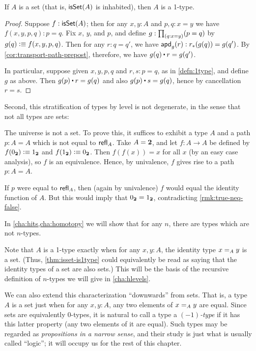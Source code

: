 \begin{lem}\label{thm:isset-is1type}
  If $A$ is a set (that is, $\isset(A)$ is inhabited), then $A$ is a 1-type.
\end{lem}
\begin{proof}
  Suppose $f:\isset(A)$; then for any $x,y:A$ and $p,q:x=y$ we have $f(x,y,p,q):p=q$.
  Fix $x$, $y$, and $p$, and define $g: \prd{q:x=y} (p=q)$ by $g(q) \defeq f (x,y,p,q)$.
  Then for any $r:q=q'$, we have $\apdfunc{g}(r) : \trans{r}{g(q)} = g(q')$.
  By \autoref{cor:transport-path-prepost}, therefore, we have $g(q) \ct r = g(q')$.

  In particular, suppose given $x,y,p,q$ and $r,s:p=q$, as in \autoref{defn:1type}, and define $g$ as above.
  Then $g(p) \ct r = g(q)$ and also $g(p) \ct s = g(q)$, hence by cancellation $r=s$.
\end{proof}

Second, this stratification of types by level is not degenerate, in the
sense that not all types are sets:

\begin{eg}\label{thm:type-is-not-a-set}
  The universe \type is not a set.
  To prove this, it suffices to exhibit a type $A$ and a path $p:A=A$ which is not equal to $\refl A$.
  Take $A=\bool$, and let $f:A\to A$ be defined by $f(\bfalse)\defeq \btrue$ and $f(\btrue)\defeq \bfalse$.
  Then $f(f(x))=x$ for all $x$ (by an easy case analysis), so $f$ is an equivalence.
  Hence, by univalence, $f$ gives rise to a path $p:A=A$.

  If $p$ were equal to $\refl A$, then (again by univalence) $f$ would equal the identity function of $A$.
  But this would imply that $\bfalse=\btrue$, contradicting \autoref{rmk:true-neq-false}.
\end{eg}

In \autoref{cha:hits,cha:homotopy} we will show that for any $n$, there are types which are not $n$-types.

Note that $A$ is a 1-type exactly when for any $x,y:A$, the identity type $\id[A]xy$ is a set.
(Thus, \autoref{thm:isset-is1type} could equivalently be read as saying that the identity types of a set are also sets.)
This will be the basis of the recursive definition of $n$-types we will give in \autoref{cha:hlevels}.

We can also extend this characterization ``downwards'' from sets.
That is, a type $A$ is a set just when for any $x,y:A$, any two elements of $\id[A]xy$ are equal.
Since sets are equivalently 0-types, it is natural to call a type a \emph{$(-1)$-type} if it has this latter property (any two elements of it are equal).
Such types may be regarded as \emph{propositions in a narrow sense}, and their study is just what is usually called ``logic''; it will occupy us for the rest of this chapter.


